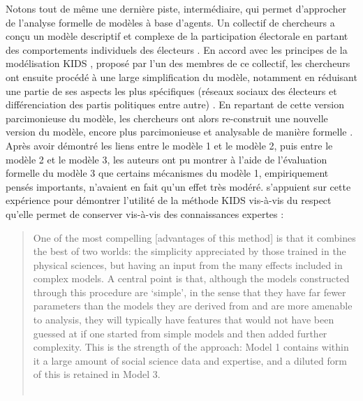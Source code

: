 Notons tout de même une dernière piste, intermédiaire, qui permet d'approcher de l'analyse formelle de modèles à base d'agents.
Un collectif de chercheurs a conçu un modèle descriptif et complexe de la participation électorale en partant des comportements individuels des électeurs \autocite[\og{}Modèle 1\fg{}]{edmonds2014complex,fieldhouse_cascade_2016}.
En accord avec les principes de la modélisation KIDS \autocite{edmonds_kiss_2005}, proposé par l'un des membres de ce collectif, les chercheurs ont ensuite procédé à une large simplification du modèle, notamment en réduisant une partie de ses aspects les plus spécifiques (réseaux sociaux des électeurs et différenciation des partis politiques entre autre) \autocite[\og{}Modèle 2\fg{}]{lafuerza_2_staged_2016}.
En repartant de cette version parcimonieuse du modèle, les chercheurs ont alors re-construit une nouvelle version du modèle, encore plus parcimonieuse et analysable de manière formelle \autocite[\og{}Modèle 3\fg{}]{lafuerza_3_simplification_2016}.
Après avoir démontré les liens entre le modèle 1 et le modèle 2, puis entre le modèle 2 et le modèle 3, les auteurs ont pu montrer à l'aide de l'évaluation formelle du modèle 3 que certains mécanismes du modèle 1, empiriquement pensés importants, n'avaient en fait qu'un effet très modéré.
\textcite{lafuerza_3_simplification_2016} s'appuient sur cette expérience pour démontrer l'utilité de la méthode KIDS vis-à-vis du respect qu'elle permet de conserver vis-à-vis des connaissances expertes :
\begin{quotation}
	\noindent \og
One of the most compelling [advantages of this method] is that it combines the best of two worlds:
the simplicity appreciated by those trained in the physical sciences, but having an input from the many effects included in complex models.
A central point is that, although the models constructed through this procedure are ‘simple’, in the sense that they have far fewer parameters than the models they are derived from and are more amenable to analysis, they will typically have features that would not have been guessed at if one started from simple models and then added further complexity.
This is the strength of the approach:
Model 1 contains within it a large amount of social science data and expertise, and a diluted form of this is
retained in Model 3.
	\fg{}\\
	\mbox{}~ \hfill \textcite[6]{lafuerza_3_simplification_2016}
\end{quotation}

